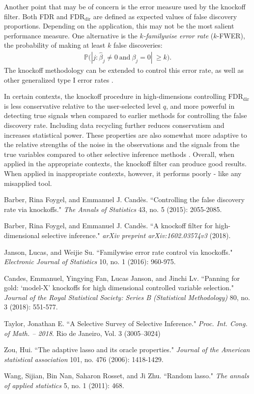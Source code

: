 \documentclass[]{scrartcl}
\newcommand{\1}[1]{\mathbbm{1}_{\left\{#1\right\}}}
\begin{document}
\noindent
Another point that may be of concern is the error measure used by the knockoff filter. Both FDR and FDR$_{\text{dir}}$ are defined as expected values of false discovery proportions. Depending on the application, this may not be the most salient performance measure. One alternative is the \textit{$k$-familywise error rate} ($k$-FWER), the probability of making at least $k$ false discoveries: 
\begin{align}\label{kfwer}
\mathbb{P}\big(|j: \widehat{\beta}_{j} \neq 0\ \text{and}\ \beta_{j} = 0|\ \geq k  \big).
\end{align}
The knockoff methodology can be extended to control this error rate, as well as other generalized type I error rates \cite{kofw}. 

\noindent
In certain contexts,  the knockoff procedure in high-dimensions controlling FDR$_{\text{dir}}$ is less conservative relative to the user-selected level $q$, and more powerful in detecting true signals when compared to earlier methods for controlling the false discovery rate. Including data recycling further reduces conservatism and increases statistical power. These properties are also somewhat more adaptive to the relative strengths of the noise in the observations and the signals from the true variables compared to other selective inference methods \cite{kohd}. Overall, when applied in the appropriate contexts, the knockoff filter can produce good results. When applied in inappropriate contexts, however, it performs poorly - like any misapplied tool.
\begin{thebibliography}{9}
	Barber, Rina Foygel, and Emmanuel J. Candès. ``Controlling the false discovery rate via knockoffs." \textit{The Annals of Statistics} 43, no. 5 (2015): 2055-2085.
	
	Barber, Rina Foygel, and Emmanuel J. Cand\`es. ``A knockoff filter for high-dimensional selective inference." \textit{arXiv preprint arXiv:1602.03574v3} (2018).
	
	Janson, Lucas, and Weijie Su. ``Familywise error rate control via knockoffs." \textit{Electronic Journal of Statistics} 10, no. 1 (2016): 960-975.
	
	Candes, Emmanuel, Yingying Fan, Lucas Janson, and Jinchi Lv. ``Panning for gold: ‘model‐X’ knockoffs for high dimensional controlled variable selection." \textit{Journal of the Royal Statistical Society: Series B (Statistical Methodology)} 80, no. 3 (2018): 551-577.
	
	Taylor, Jonathan E. ``A Selective Survey of Selective Inference."
	\textit{Proc. Int. Cong. of Math. – 2018}.
	Rio de Janeiro, Vol. 3 (3005–3024)
	
	Zou, Hui. ``The adaptive lasso and its oracle properties." \textit{Journal of the American statistical association} 101, no. 476 (2006): 1418-1429.
	
	Wang, Sijian, Bin Nan, Saharon Rosset, and Ji Zhu. ``Random lasso." \textit{The annals of applied statistics} 5, no. 1 (2011): 468.
\end{thebibliography}
\end{document}
